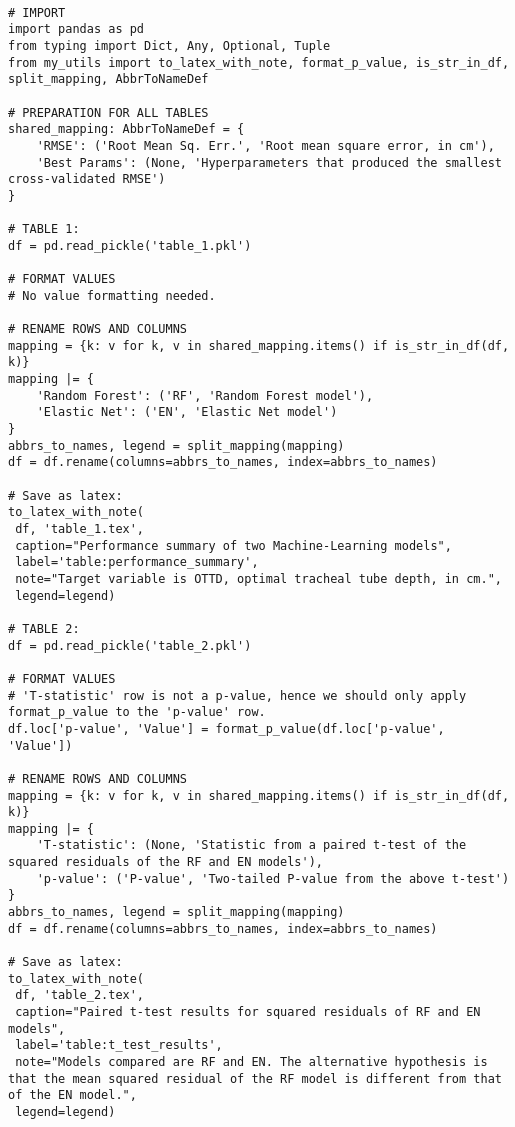 \documentclass[11pt]{article}
\begin{document}
\begin{verbatim}

# IMPORT
import pandas as pd
from typing import Dict, Any, Optional, Tuple
from my_utils import to_latex_with_note, format_p_value, is_str_in_df, split_mapping, AbbrToNameDef

# PREPARATION FOR ALL TABLES
shared_mapping: AbbrToNameDef = {
    'RMSE': ('Root Mean Sq. Err.', 'Root mean square error, in cm'),
    'Best Params': (None, 'Hyperparameters that produced the smallest cross-validated RMSE')
}

# TABLE 1:
df = pd.read_pickle('table_1.pkl')

# FORMAT VALUES 
# No value formatting needed.

# RENAME ROWS AND COLUMNS
mapping = {k: v for k, v in shared_mapping.items() if is_str_in_df(df, k)} 
mapping |= {
    'Random Forest': ('RF', 'Random Forest model'),
    'Elastic Net': ('EN', 'Elastic Net model')
}
abbrs_to_names, legend = split_mapping(mapping)
df = df.rename(columns=abbrs_to_names, index=abbrs_to_names)

# Save as latex:
to_latex_with_note(
 df, 'table_1.tex',
 caption="Performance summary of two Machine-Learning models", 
 label='table:performance_summary',
 note="Target variable is OTTD, optimal tracheal tube depth, in cm.",
 legend=legend)

# TABLE 2:
df = pd.read_pickle('table_2.pkl')

# FORMAT VALUES 
# 'T-statistic' row is not a p-value, hence we should only apply format_p_value to the 'p-value' row.
df.loc['p-value', 'Value'] = format_p_value(df.loc['p-value', 'Value'])

# RENAME ROWS AND COLUMNS
mapping = {k: v for k, v in shared_mapping.items() if is_str_in_df(df, k)} 
mapping |= {
    'T-statistic': (None, 'Statistic from a paired t-test of the squared residuals of the RF and EN models'),
    'p-value': ('P-value', 'Two-tailed P-value from the above t-test')
}
abbrs_to_names, legend = split_mapping(mapping)
df = df.rename(columns=abbrs_to_names, index=abbrs_to_names)

# Save as latex:
to_latex_with_note(
 df, 'table_2.tex',
 caption="Paired t-test results for squared residuals of RF and EN models", 
 label='table:t_test_results',
 note="Models compared are RF and EN. The alternative hypothesis is that the mean squared residual of the RF model is different from that of the EN model.",
 legend=legend)

\end{verbatim}
\end{document}
